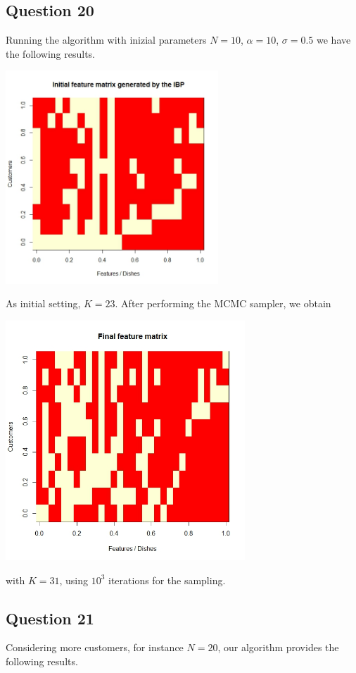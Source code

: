\documentclass[]{article}
\begin{document}
	\subsection*{Question 20}
	Running the algorithm with inizial parameters $N = 10$, $\alpha = 10$, $\sigma=0.5$ we have the following results.
	\\
	\begin{center}
		\includegraphics[width=8cm]{task7/output_initial_alpha10_sigma05_N10.jpeg}
	\end{center}
	As initial setting, $K=23$. After performing the MCMC sampler, we obtain
	\\
	\begin{center}
		\includegraphics[width=9cm]{task7/output_final_alpha10_sigma05_N10.jpeg}
	\end{center}
	with $K=31$, using $10^3$ iterations for the sampling. 
	
	
	\subsection*{Question 21}
	Considering more customers, for instance $N=20$, our algorithm provides the following results.
	
\end{document}
